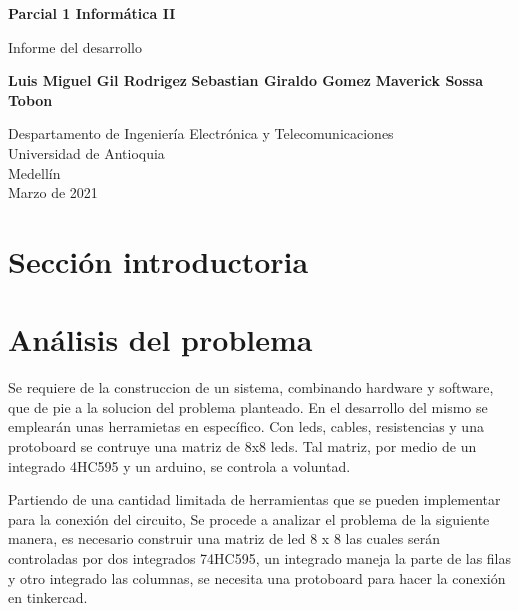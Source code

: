 \documentclass{article}
\begin{document}
\begin{titlepage}
    \begin{center}
        \vspace*{1cm}
            
        \Huge
        \textbf{Parcial 1 Informática II}
            
        \vspace{0.5cm}
        \LARGE
        Informe del desarrollo
            
        \vspace{1.5cm}
            
        \textbf{Luis Miguel Gil Rodrigez}
        \newline
        \textbf{Sebastian Giraldo Gomez}
        \newline
        \textbf{Maverick Sossa Tobon}
        \newline
            
        \vfill
            
        \vspace{0.8cm}
            
        \Large
        Despartamento de Ingeniería Electrónica y Telecomunicaciones\\
        Universidad de Antioquia\\
        Medellín\\
        Marzo de 2021
            
    \end{center}
\end{titlepage}

\tableofcontents
\newpage
\section{Sección introductoria}\label{intro}


\section{Análisis del problema} \label{contenido}
Se requiere de la construccion de un sistema, combinando hardware y software, que de pie a la solucion del problema planteado. En el desarrollo del mismo se emplearán unas herramietas en específico. Con leds, cables, resistencias y una protoboard se contruye una matriz de 8x8 leds. 
Tal matriz, por medio de un integrado 4HC595 y un arduino, se controla a voluntad. 
\newline

Partiendo de una cantidad limitada de herramientas que se pueden implementar para la conexión del circuito, 
Se procede a analizar el problema de la siguiente manera, es necesario construir una matriz de led 8 x 8 las cuales serán controladas por dos integrados 74HC595, un integrado maneja la parte de las filas y otro integrado las columnas, se necesita una protoboard para hacer la conexión en tinkercad.
\newline
\end{document}
